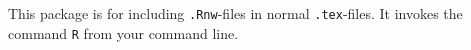 This package is for including \texttt{.Rnw}-files in normal \texttt{.tex}-files.
It invokes the command \texttt{R} from your command line.\\

